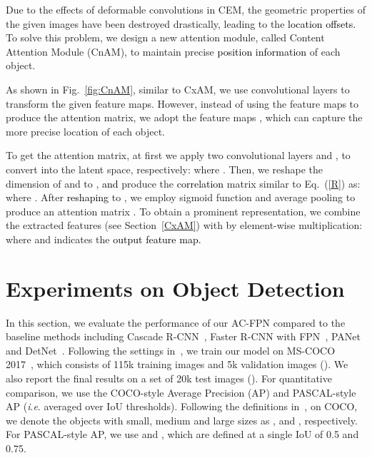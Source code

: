 \documentclass[journal]{IEEEtran}
\newcommand{\ie}{\textit{i}.\textit{e}.\xspace}
\def\qcr{\fontfamily{qcr}\selectfont}
\def\myblue{\textcolor{black}}
\begin{document}
	
	Due to the effects of deformable convolutions in CEM, the geometric properties of the given images have been destroyed drastically, leading to the \myblue{location offsets.} To solve this problem, we design a new attention module, called Content Attention Module (CnAM), to maintain precise \myblue{position information} of each object.
	


	As shown in Fig.~\ref{fig:CnAM}, similar to CxAM, we use convolutional layers to transform the given feature maps. However, instead of using the feature maps  to produce the attention matrix, we adopt the feature maps , which can capture the more precise location
of each object.


	To get the attention matrix, at first we apply two convolutional layers  and , to convert  into the latent space, respectively:
	{
		}where . Then, we reshape  the dimension of  and  to , \myblue{and} produce the \myblue{correlation} matrix similar to Eq.~(\ref{R}) as:
	{
		}where . 
After \myblue{reshaping}  to , we employ sigmoid function and average pooling to produce an attention matrix .
	To obtain a prominent representation, we combine the extracted features  (see Section~\ref{CxAM}) with  by element-wise multiplication:
	{
		}where  and  indicates the  \myblue{output feature map.}


	

	
	
	\section{Experiments on Object Detection}
	

	In this section, we evaluate the performance of our AC-FPN compared to the baseline methods including Cascade R-CNN~\cite{cai2018cascade}, Faster R-CNN with FPN~\cite{lin2017feature},
PANet~\cite{liu2018path} and DetNet~\cite{li2018detnet}.
Following the settings in~\cite{cai2018cascade,liu2018path}, we train our model on MS-COCO 2017~\cite{lin2014microsoft}, which consists of 115k training images and 5k validation images ({\qcr{minival}}). We also report the final results on a set of 20k test images ({\qcr{test-dev}}). For quantitative comparison, we use the COCO-style Average Precision (AP) and PASCAL-style AP (\ie averaged over IoU thresholds). Following the definitions in~\cite{lin2014microsoft}, on COCO, we denote the objects with small, medium and large sizes as ,  and , respectively. For PASCAL-style AP, we use  and , which are defined at a single IoU of 0.5 and 0.75.
	
\end{document}
